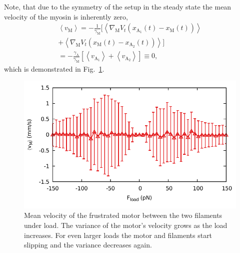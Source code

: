 \documentclass[aps,pre,twocolumn,showpacs,showkeys,superscriptaddress,floatfix]{revtex4-1}
\begin{document}
Note, that due to the symmetry of the setup in the steady state the mean velocity of the myosin is inherently zero,
\begin{multline*}
\left\langle v_\text{M} \right\rangle 
= - \frac{1}{\gamma_\text{M}} \bigl[ 
\left\langle \nabla_\text{M} V_t( x_{\text{A}_1}(t) - x_\text{M}(t) ) \right\rangle
\\ 
+ \left\langle \nabla_\text{M} V_t( x_\text{M}(t) - x_{\text{A}_2}(t) ) \right\rangle 
\bigr] 
\\
= - \frac{\gamma_\text{A}}{\gamma_\text{M}} \left[ 
\left\langle v_{\text{A}_1} \right\rangle 
+ \left\langle v_{\text{A}_2} \right\rangle 
\right]
\equiv 0 , 
\end{multline*}
which is demonstrated in Fig.~\ref{fig:tug_F_motor}.
\begin{figure}[t]
\centering
\includegraphics[width=0.9\linewidth,height=!]{tug_F_motor}
\caption{\label{fig:tug_F_motor}
Mean velocity of the frustrated motor  between the two filaments under load. 
The variance of the motor's velocity grows as the load increases. 
For even larger loads the motor and filaments start slipping and the variance decreases again.
}
\end{figure}
\end{document}
